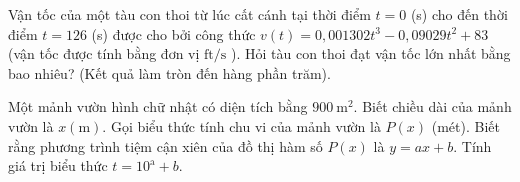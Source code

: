 \begin{ex}%
 Vận tốc của một tàu con thoi từ lúc cất cánh tại thời điểm $t=0$ (s) cho đến thời điểm $t=126$ (s) được cho bởi công thức $v(t)=0{,}001302 t^{3}-0{,}09029 t^2+83$ (vận tốc được tính bằng đơn vị $\mathrm{ft}/\mathrm{s}$ ). Hỏi tàu con thoi đạt vận tốc lớn nhất bằng bao nhiêu? (Kết quả làm tròn đến hàng phần trăm).
\end{ex}

\begin{ex}%
Một mảnh vườn hình chữ nhật có diện tích bằng $900 \mathrm{~m}^2$. Biết chiều dài của mảnh vườn là $x(\mathrm{m})$. Gọi biểu thức tính chu vi của mảnh vườn là $P(x)$ (mét). Biết rằng phương trình tiệm cận xiên của đồ thị hàm số $P(x)$ là $y=ax+b$. Tính giá trị biểu thức $t=10^{\mathrm{a}}+b$.
\end{ex}


